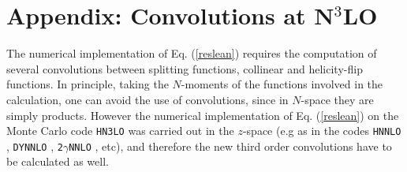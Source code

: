 \documentclass[12pt]{article}
\begin{document}
\section{Appendix: Convolutions at N$^{3}$LO}
\label{Sec:Convos}
The numerical implementation of Eq. (\ref{reslean}) requires the computation of several convolutions between splitting functions, collinear and helicity-flip functions. In principle, taking the $N$-moments of the functions involved in the calculation, one can avoid the use of convolutions, since in $N$-space they are simply products. However the numerical implementation of Eq. (\ref{reslean}) on the Monte Carlo code \texttt{HN3LO} was carried out in the $z$-space (e.g as in the codes \texttt{HNNLO} \cite{Catani:2007vq}, \texttt{DYNNLO} \cite{Catani:2009sm}, \texttt{2$\gamma$NNLO} \cite{Catani:2011qz}, etc), and therefore the new third order convolutions have to be calculated as well. 
\end{document}

